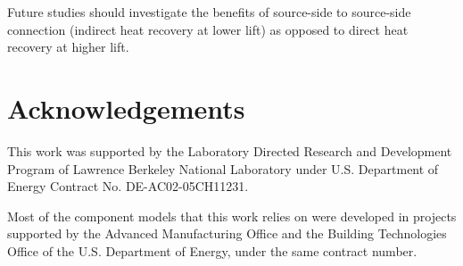 Future studies should investigate the benefits of source-side to source-side connection (indirect heat recovery at lower lift) as opposed to direct heat recovery at higher lift.


\section{Acknowledgements} \label{sec:acknowledge}

This work was supported by the Laboratory Directed Research and Development Program of Lawrence Berkeley National Laboratory under U.S. Department of Energy Contract No. DE-AC02-05CH11231.

Most of the component models that this work relies on were developed in projects supported by the Advanced Manufacturing Office and the Building Technologies Office of the U.S. Department of Energy, under the same contract number.


